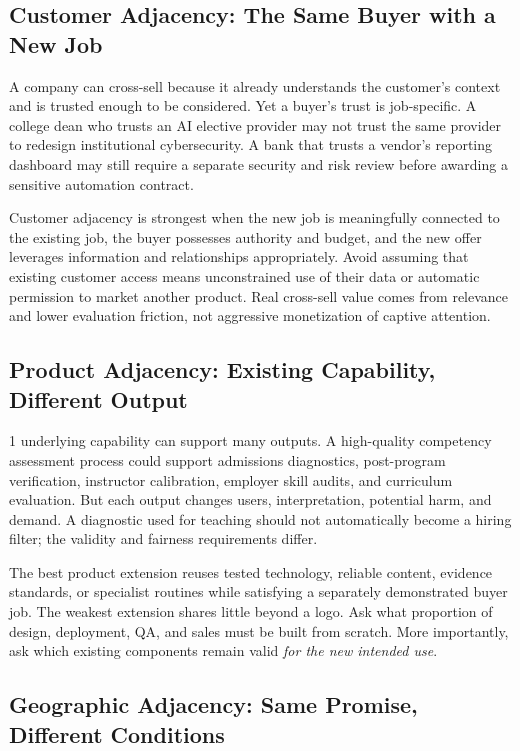 \subsection{Customer Adjacency: The Same Buyer with a New Job}
\label{sec:customer_adjacency_same_buyer}

A company can cross-sell because it already understands the customer's context and is trusted enough to be considered. Yet a buyer's trust is job-specific. A college dean who trusts an AI elective provider may not trust the same provider to redesign institutional cybersecurity. A bank that trusts a vendor's reporting dashboard may still require a separate security and risk review before awarding a sensitive automation contract.

Customer adjacency is strongest when the new job is meaningfully connected to the existing job, the buyer possesses authority and budget, and the new offer leverages information and relationships appropriately. Avoid assuming that existing customer access means unconstrained use of their data or automatic permission to market another product. Real cross-sell value comes from relevance and lower evaluation friction, not aggressive monetization of captive attention.

\subsection{Product Adjacency: Existing Capability, Different Output}
\label{sec:product_adjacency_different_output}

1 underlying capability can support many outputs. A high-quality competency assessment process could support admissions diagnostics, post-program verification, instructor calibration, employer skill audits, and curriculum evaluation. But each output changes users, interpretation, potential harm, and demand. A diagnostic used for teaching should not automatically become a hiring filter; the validity and fairness requirements differ.

The best product extension reuses tested technology, reliable content, evidence standards, or specialist routines while satisfying a separately demonstrated buyer job. The weakest extension shares little beyond a logo. Ask what proportion of design, deployment, QA, and sales must be built from scratch. More importantly, ask which existing components remain valid \textit{for the new intended use}.

\subsection{Geographic Adjacency: Same Promise, Different Conditions}
\label{sec:geographic_adjacency_different_conditions}


